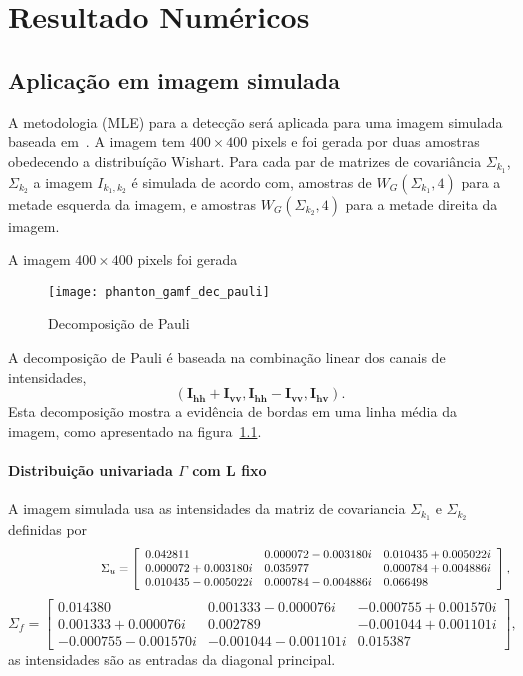 \chapter{Resultado Numéricos}\label{resul_numericos}


\section{Aplicação em imagem simulada}
A metodologia (MLE) para a detecção será aplicada para uma imagem simulada baseada em~\cite{nhfc,gamf}. A imagem tem $400\times400$ pixels e foi gerada por duas amostras obedecendo a distribuíção Wishart. Para cada par de matrizes de covariância $\Sigma_{k_1}$, $\Sigma_{k_2}$ a imagem $I_{k_1,k_2}$ é simulada de acordo com, amostras de $W_G(\Sigma_{k_1}, 4)$ para a metade esquerda da imagem, e  amostras $W_G(\Sigma_{k_2}, 4)$ para a metade direita da imagem.


A imagem $400 \times 400$ pixels foi gerada
\begin{figure}[hbt]
	\centering
	\texttt{[image: phanton\_gamf\_dec\_pauli]}%
	\caption{Decomposição de Pauli}
\label{fig:simulada_gamf_dec_pauli}
\end{figure}

A decomposição de Pauli é baseada na combinação linear dos canais de intensidades, 
$$(\mathbf{I_\text{hh}+I_{\text{vv}}}, \mathbf{I_\text{hh}-I_{\text{vv}}}, \mathbf{I_\text{hv}}).$$ 
Esta decomposição mostra a evidência de bordas em uma linha média da imagem, como apresentado na figura~\ref{fig:simulada_gamf_dec_pauli}. 
\subsubsection*{Distribuição univariada $\Gamma$ com L fixo}

A imagem simulada  usa as intensidades da matriz de covariancia $\Sigma_{k_1}$ e $\Sigma_{k_2}$ definidas por
\begin{equation}\label{matriz_sigma_gamf_1}
	\hspace{2.75cm} \Sigma_{u}= \left[
\begin{array}{lll}
0.042811            & 0.000072-0.003180i & 0.010435+0.005022i\\
0.000072+0.003180i  & 0.035977           & 0.000784+0.004886i\\
0.010435-0.005022i  & 0.000784-0.004886i & 0.066498
\end{array}
\right],
\end{equation}
\begin{equation}\label{matriz_sigma_gamf_2}
 \Sigma_{f}= \left[
\begin{array}{lll}
0.014380            & 0.001333-0.000076i & -0.000755+0.001570i\\
0.001333+0.000076i  & 0.002789           & -0.001044+0.001101i\\
-0.000755-0.001570i &-0.001044-0.001101i & 0.015387
\end{array}
\right],
\end{equation}
as intensidades são as entradas da diagonal principal.  
    

